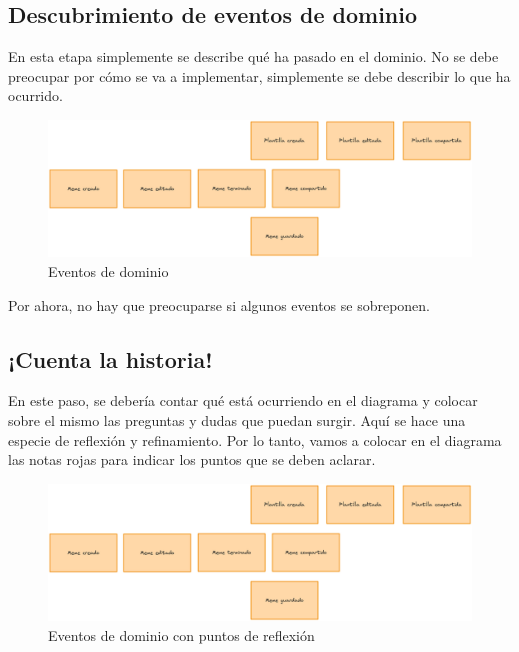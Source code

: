 \subsection{Descubrimiento de eventos de dominio}

En esta etapa simplemente se describe qué ha pasado en el dominio. No se debe preocupar por cómo se va a implementar, simplemente se debe describir lo que ha ocurrido.

\begin{figure}[ht]
    \caption{Eventos de dominio}
    \centering
    \vspace*{0.5cm}
    \includegraphics[scale=0.15]{figuras/eventosdominio.png}
\end{figure}

Por ahora, no hay que preocuparse si algunos eventos se sobreponen.

\subsection{¡Cuenta la historia!}

En este paso, se debería contar qué está ocurriendo en el diagrama y colocar sobre el mismo las preguntas y dudas que puedan surgir. Aquí se hace una especie de reflexión y refinamiento. Por lo tanto, vamos a colocar en el diagrama las notas rojas para indicar los puntos que se deben aclarar.

\begin{figure}[ht]
    \caption{Eventos de dominio con puntos de reflexión}
    \centering
    \vspace*{0.5cm}
    \includegraphics[scale=0.15]{figuras/eventosdominio.png}
\end{figure}

